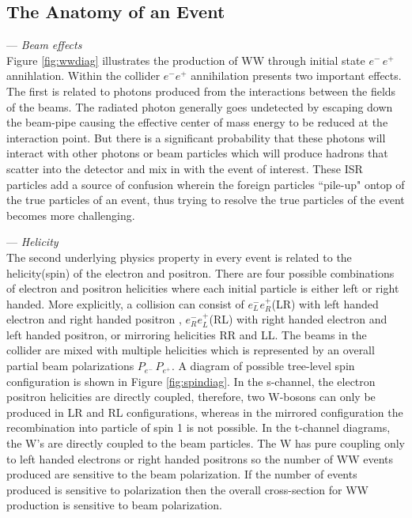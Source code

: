 \subsection{The Anatomy of an Event}
\label{subsec:collphsx}
--- \textit{Beam effects}\\
Figure \ref{fig:wwdiag} illustrates the production of WW through initial state $e^- \, e^+$ annihlation. Within the collider $e^- e^+$ annihilation presents two important effects. The first is related to photons produced from the interactions between the fields of the beams. The radiated photon generally goes undetected by escaping down the beam-pipe causing the effective center of mass energy to be reduced at the interaction point. But there is a significant probability that these photons will interact with other photons or beam particles which will produce hadrons that scatter into the detector and mix in with the event of interest. These ISR particles add a source of confusion wherein the foreign particles ``pile-up"  ontop of the true particles of an event, thus  trying to resolve the true particles of the event becomes more challenging. 

--- \textit{Helicity}\\
The second underlying physics property in every event is related to the helicity(spin) of the electron and positron. There are four possible combinations of electron and positron helicities where each initial particle is either left or right handed. More explicitly, a collision can consist of  $e^-_L e^+_R$(LR) with left handed electron and right handed positron , $e^-_R e^+_L$(RL)  with right handed electron and left handed positron, or mirroring helicities RR and LL.  The beams in the collider are mixed with multiple helicities which is represented by an overall partial beam polarizations $P_{e^-} \, P_{e^+}$. A diagram of possible tree-level spin configuration is shown in Figure \ref{fig:spindiag}. In the s-channel, the electron positron helicities  are directly coupled, therefore, two W-bosons can only be produced in LR and RL configurations, whereas in the mirrored configuration the  recombination into particle of spin 1 is  not possible. In the t-channel diagrams, the W's are directly coupled to the beam particles. The W has pure coupling only to left handed electrons or right handed positrons so the number of  WW events produced are sensitive to the beam polarization\cite{thomson}.  If the number of events produced is sensitive to polarization then the overall cross-section for WW production is sensitive to beam polarization. 

